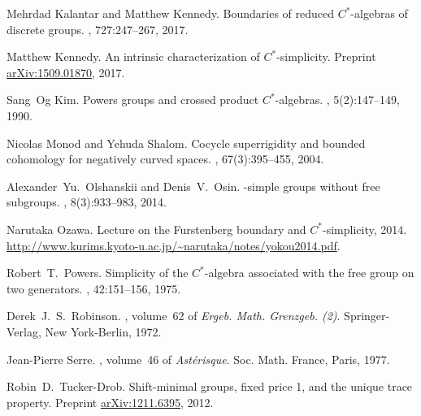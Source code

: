 \documentclass[a4paper]{amsart}
\theoremstyle{plain}
\theoremstyle{definition}
\theoremstyle{remark}
\numberwithin{theorem}{section}
\begin{document}
\begin{thebibliography}{99}
Mehrdad Kalantar and Matthew Kennedy.
\newblock Boundaries of reduced {$C^*$}-algebras of discrete groups.
, 727:247--267, 2017.

Matthew Kennedy.
\newblock An intrinsic characterization of {$C^*$}-simplicity.
\newblock Preprint \href{http://arxiv.org/abs/1509.01870}{arXiv:1509.01870}, 2017.

Sang~Og Kim.
\newblock Powers groups and crossed product {$C^*$}-algebras.
, 5(2):147--149, 1990.

Nicolas Monod and Yehuda Shalom.
\newblock Cocycle superrigidity and bounded cohomology for negatively curved spaces.
, 67(3):395--455, 2004.

Alexander~Yu.\ Olshanskii and Denis~V.\ Osin.
-simple groups without free subgroups.
, 8(3):933--983, 2014.

Narutaka Ozawa.
\newblock Lecture on the {F}urstenberg boundary and {$C^*$}-simplicity, 2014.
\newblock \url{http://www.kurims.kyoto-u.ac.jp/~narutaka/notes/yokou2014.pdf}.

Robert~T.\ Powers.
\newblock Simplicity of the {$C^*$}-algebra associated with the free group on two generators.
, 42:151--156, 1975.

Derek~J.~S.\ Robinson.
, volume~62 of {\em Ergeb. Math. Grenzgeb. (2)}.
\newblock Springer-Verlag, New York-Berlin, 1972.

Jean-Pierre Serre.
, volume~46 of {\em Ast{\'e}risque}.
\newblock Soc. Math. France, Paris, 1977.

Robin~D.\ Tucker-Drob.
\newblock Shift-minimal groups, fixed price 1, and the unique trace property.
\newblock Preprint \href{http://arxiv.org/abs/1211.6395}{arXiv:1211.6395}, 2012.

\end{thebibliography}
\end{document}

